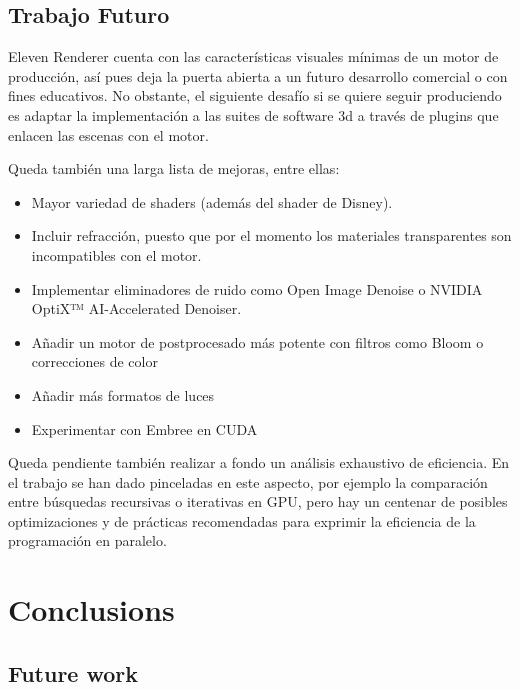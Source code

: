 \section{Trabajo Futuro}
	
Eleven Renderer cuenta con las características visuales mínimas de un motor de producción, así pues deja la puerta abierta a un futuro desarrollo comercial o con fines educativos. No obstante, el siguiente desafío si se quiere seguir produciendo es adaptar la implementación a las suites de software 3d a través de plugins que enlacen las escenas con el motor. 

Queda también una larga lista de mejoras, entre ellas:

\begin{itemize}
	
	\item Mayor variedad de shaders (además del shader de Disney).
	\item Incluir refracción, puesto que por el momento los materiales transparentes son incompatibles con el motor.
	\item Implementar eliminadores de ruido como Open Image Denoise o NVIDIA OptiX™ AI-Accelerated Denoiser.
	\item Añadir un motor de postprocesado más potente con filtros como Bloom o correcciones de color
	\item Añadir más formatos de luces
	\item Experimentar con Embree en CUDA
	
\end{itemize}

Queda pendiente también realizar a fondo un análisis exhaustivo de eficiencia. En el trabajo se han dado pinceladas en este aspecto, por ejemplo la comparación entre búsquedas recursivas o iterativas en GPU, pero hay un centenar de posibles optimizaciones y de prácticas recomendadas para exprimir la eficiencia de la programación en paralelo.

\chapter*{Conclusions}


\section{Future work}
	
